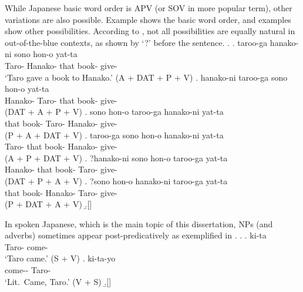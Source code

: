 While Japanese basic word order is APV (or SOV in more popular term),
other variations are also possible.
Example \Next[a] shows the basic word order, and
examples \Next[b--f] show other possibilities.
According to ,
not all possibilities are equally natural in out-of-the-blue contexts,
as shown by `?' before the sentence.
%
\ex.
 \ag. taroo-ga hanako-ni sono hon-o yat-ta \\
      Taro- Hanako- that book- give- \\
      `Taro gave a book to Hanako.' \hfill{(A + DAT + P + V)}
 \bg. hanako-ni taroo-ga sono hon-o yat-ta \\
      Hanako- Taro- that book- give- \\
      \hfill{(DAT + A + P + V)}
 \bg. sono hon-o taroo-ga hanako-ni yat-ta \\
      that book- Taro- Hanako- give- \\
      \hfill{(P + A + DAT + V)}
 \bg. taroo-ga sono hon-o hanako-ni yat-ta \\
      Taro- that book- Hanako- give- \\
      \hfill{(A + P + DAT + V)}
 \bg. ?hanako-ni sono hon-o taroo-ga yat-ta \\
      Hanako- that book- Taro- give- \\
      \hfill{(DAT + P + A + V)}
 \bg. ?sono hon-o hanako-ni taroo-ga yat-ta \\
      that book- Hanako-  Taro- give- \\
      \hfill{(P + DAT + A + V)}
 \b.[] \hfill{\cite[260]{shibatani90}}

In spoken Japanese, which is the main topic of this dissertation,
NPs (and adverbs) sometimes appear post-predicatively as exemplified in \Next[b].
%
\ex.
 \ag.  ki-ta \\
      Taro- come- \\
      `Taro came.' \hfill{(S + V)}
 \bg. ki-ta-yo  \\
      come-- Taro- \\
      `Lit.~Came, Taro.' \hfill{(V + S)}
 \b.[] \hfill{\cite[p.~258--259]{shibatani90}}



